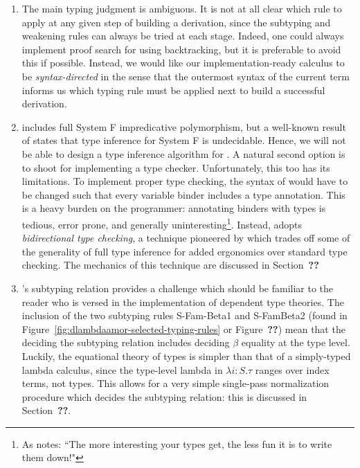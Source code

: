 \begin{enumerate}
  \item The main typing judgment is ambiguous. It is not at all clear which rule to apply at any given step of building a derivation, since the subtyping and weakening rules can always be tried at each stage. Indeed, one could always implement proof search for \dlambdaamor using backtracking, but it is preferable to avoid this if possible. Instead, we would like our implementation-ready calculus \bilambdaamor {} to be \textit{syntax-directed} in the sense that the outermost syntax of the current term informs us which typing rule must be applied next to build a successful derivation. 
  
  \item \dlambdaamor includes full System F impredicative polymorphism, but a well-known result of  states that type inference for System F is undecidable. Hence, we will not be able to design a type inference algorithm for \dlambdaamor. A natural second option is to shoot for implementing a type checker. Unfortunately, this too has its limitations. To implement proper type checking, the syntax of \dlambdaamor would have to be changed such that every variable binder includes a type annotation. This is a heavy burden on the programmer: annotating binders with types is tedious, error prone, and generally uninteresting\footnote{
As \citet{pierce:lics03} notes: ``The more interesting your types get, the less fun it is to write them down!"
  }. Instead, \bilambdaamor adopts \textit{bidirectional type checking}, a technique pioneered by \citehere which trades off some of the generality of full type inference for added ergonomics over standard type checking. The mechanics of this technique are discussed in Section~\textbf{??}
  
  \item \dlambdaamor's subtyping relation provides a challenge which should be familiar to the reader who is versed in the implementation of dependent type theories. The inclusion of the two subtyping rules S-Fam-Beta1 and S-FamBeta2 (found in Figure~\ref{fig:dlambdaamor-selected-typing-rules} or Figure~\textbf{??}) mean that the deciding the subtyping relation includes deciding $\beta$ equality at the type level. Luckily, the equational theory of types is simpler than that of a simply-typed lambda calculus, since the type-level lambda in \dlambdaamor $\lambda i : S. \tau$ ranges over index terms, not types. This allows for a very simple single-pass normalization procedure which decides the subtyping relation: this is discussed in Section~\textbf{??}.
  

\end{enumerate}
